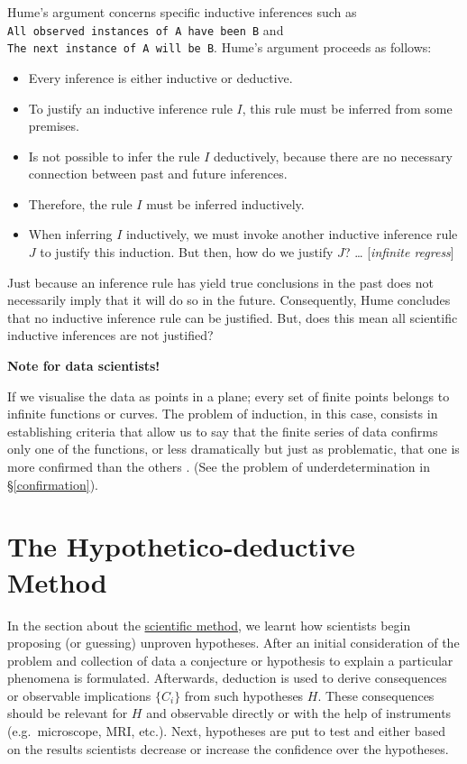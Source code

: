 \documentclass[
]{book}
\providecommand{\tightlist}{%
  \setlength{\itemsep}{0pt}\setlength{\parskip}{0pt}}
\begin{document}
Hume's argument concerns specific inductive inferences such as \texttt{All\ observed\ instances\ of\ A\ have\ been\ B} and \texttt{The\ next\ instance\ of\ A\ will\ be\ B}. Hume's argument proceeds as follows:

\begin{itemize}
\tightlist
\item
  Every inference is either inductive or deductive.
\item
  To justify an inductive inference rule \(I\), this rule must be inferred from some premises.
\item
  Is not possible to infer the rule \(I\) deductively, because there are no necessary connection between past and future inferences.
\item
  Therefore, the rule \(I\) must be inferred inductively.
\item
  When inferring \(I\) inductively, we must invoke another inductive inference rule \(J\) to justify this induction. But then, how do we justify \(J\)? \ldots{} {[}\emph{infinite regress}{]}
\end{itemize}

Just because an inference rule has yield true conclusions in the past does not necessarily imply that it will do so in the future.
Consequently, Hume concludes that no inductive inference rule can be justified. But, does this mean all scientific inductive inferences are not justified?

\begin{tipbox}

\textbf{Note for data scientists!}

If we visualise the data as points in a plane; every set of finite points belongs to infinite functions or curves. The problem of induction, in this case, consists in establishing criteria that allow us to say that the finite series of data confirms only one of the functions, or less dramatically but just as problematic, that one is more confirmed than the others \citep{diez1997fundamentos}. (See the problem of underdetermination in §\ref{confirmation}).

\end{tipbox}

\hypertarget{the-hypothetico-deductive-method}{%
\section{The Hypothetico-deductive Method}\label{the-hypothetico-deductive-method}}

In the section about the \protect\hyperlink{sci-method}{scientific method}, we learnt how scientists begin proposing (or guessing) unproven hypotheses. After an initial consideration of the problem and collection of data a conjecture or hypothesis to explain a particular phenomena is formulated. Afterwards, deduction is used to derive consequences or observable implications \(\{C_i\}\) from such hypotheses \(H\). These consequences should be relevant for \(H\) and observable directly or with the help of instruments (e.g.~microscope, MRI, etc.). Next, hypotheses are put to test and either based on the results scientists decrease or increase the confidence over the hypotheses.
\end{document}
